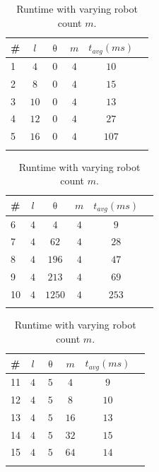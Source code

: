 \documentclass{svproc}
\begin{document}
\begin{table}[!htb]%
\begin{minipage}{.3\textwidth}
    \centering
    \begin{tabular}{|l|c|c|c|c|r|}
        \hline
         \#&$l$&$\uptheta$ &$m$&$t_{avg}(ms)$  \\ \hline
         1 & $4$ & $0$ & $4$ & $10$\\ \hline
         2 & $8$ & $0$ & $4$ & $15$\\ \hline
         3 & $10$ & $0$ & $4$ & $13$ \\ \hline
         4 & $12$ & $0$ & $4$ & $27$ \\ \hline
         5 & $16$ & $0$ & $4$ & $107$ \\ \hline
         \multicolumn{5}{c}{}\\
    \end{tabular}
    \caption{Runtime with varying curve count $l$.}
    \label{tab:curveCountScalability}
\end{minipage}
\hfill
\begin{minipage}{.3\textwidth}
    \centering
    \begin{tabular}{|l|c|c|c|c|r|}
        \hline
         \#&$l$&$\uptheta$ &$m$&$t_{avg}(ms)$  \\ \hline
         6 & $4$ & $4$ & $4$ & $9$ \\ \hline
         7 & $4$ & $62$ & $4$ & $28$ \\ \hline
         8 & $4$ & $196$ & $4$ & $47$  \\ \hline
         9 & $4$ & $213$ & $4$ & $69$  \\ \hline
         10 & $4$ & $1250$ & $4$ & $253$  \\ \hline
         \multicolumn{5}{c}{}\\
    \end{tabular}
    \caption{Runtime with varying occupied cells $\uptheta$.}
    \label{tab:obstacleCountScalability}
\end{minipage}
\hfill
\begin{minipage}{.3\textwidth}
    \centering
    \begin{tabular}{|l|c|c|c|c|r|}
        \hline
         \#&$l$&$\uptheta$ &$m$&$t_{avg}(ms)$  \\ \hline
         11 & $4$ & $5$ & $4$ &$9$\\ \hline
         12 & $4$ & $5$ & $8$ & $10$ \\ \hline
         13 & $4$ & $5$ & $16$ & $13$ \\ \hline
         14 & $4$ & $5$ & $32$ & $15$  \\ \hline
         15 & $4$ & $5$ & $64$ & $14$  \\ \hline
         \multicolumn{5}{c}{}\\
    \end{tabular}
    \caption{Runtime with varying robot count $m$.}
    \label{tab:robotCountScalability}
\end{minipage}
\end{table}
\end{document}
